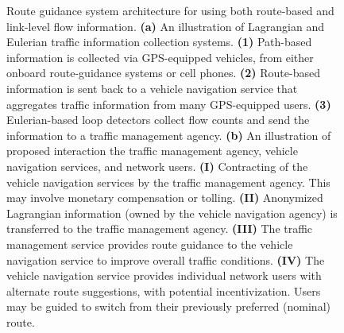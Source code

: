 \begin{figure}
\centering
{}\hfill%
\protect\caption[Route guidance system architecture for using both route-based and
link-level flow information.]{Route guidance system architecture for using both route-based and
link-level flow information. \textbf{(a)} An illustration of Lagrangian
and Eulerian traffic information collection systems. \textbf{(1)}
Path-based information is collected via GPS-equipped vehicles, from
either onboard route-guidance systems or cell phones. \textbf{(2)}
Route-based information is sent back to a vehicle navigation service
that aggregates traffic information from many GPS-equipped users.
\textbf{(3)} Eulerian-based loop detectors collect flow counts and
send the information to a traffic management agency. \textbf{(b)}
An illustration of proposed interaction the traffic management agency,
vehicle navigation services, and network users. \textbf{(I)} Contracting
of the vehicle navigation services by the traffic management agency.
This may involve monetary compensation or tolling. \textbf{(II)} Anonymized
Lagrangian information (owned by the vehicle navigation agency) is
transferred to the traffic management agency. \textbf{(III)} The traffic
management service provides route guidance to the vehicle navigation
service to improve overall traffic conditions. \textbf{(IV)} The vehicle
navigation service provides individual network users with alternate
route suggestions, with potential incentivization. Users may be guided
to switch from their previously preferred (nominal) route.\label{fig:Lagrangian-Eulerian-route-guidan}}
\end{figure}


